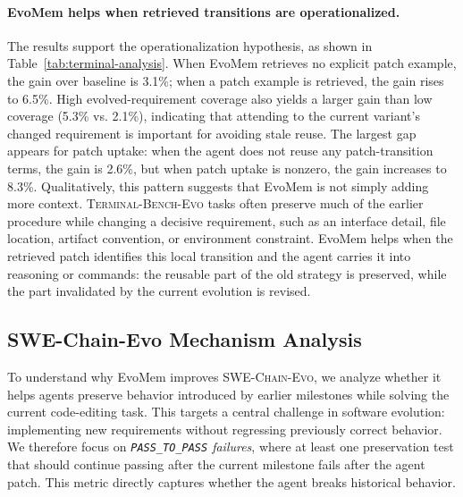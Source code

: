 \documentclass{article}
\begin{document}
\paragraph{EvoMem helps when retrieved transitions are operationalized.}
The results support the operationalization hypothesis, as shown in Table~\ref{tab:terminal-analysis}. When EvoMem retrieves no explicit patch example, the gain over baseline is 3.1\%; when a patch example is retrieved, the gain rises to 6.5\%. High evolved-requirement coverage also yields a larger gain than low coverage (5.3\% vs. 2.1\%), indicating that attending to the current variant's changed requirement is important for avoiding stale reuse. The largest gap appears for patch uptake: when the agent does not reuse any patch-transition terms, the gain is 2.6\%, but when patch uptake is nonzero, the gain increases to 8.3\%. Qualitatively, this pattern suggests that EvoMem is not simply adding more context. \textsc{Terminal-Bench-Evo} tasks often preserve much of the earlier procedure while changing a decisive requirement, such as an interface detail, file location, artifact convention, or environment constraint. EvoMem helps when the retrieved patch identifies this local transition and the agent carries it into reasoning or commands: the reusable part of the old strategy is preserved, while the part invalidated by the current evolution is revised.









\subsection{SWE-Chain-Evo Mechanism Analysis}

To understand why EvoMem improves \textsc{SWE-Chain-Evo}, we analyze whether it helps agents preserve behavior introduced by earlier milestones while solving the current code-editing task. This targets a central challenge in software evolution: implementing new requirements without regressing previously correct behavior. We therefore focus on \emph{\texttt{PASS\_TO\_PASS} failures}, where at least one preservation test that should continue passing after the current milestone fails after the agent patch. This metric directly captures whether the agent breaks historical behavior.
\end{document}
